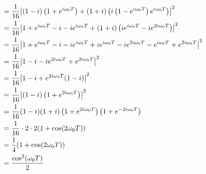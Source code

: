 \documentclass[11pt]{article}
\DeclarePairedDelimiter\abs{\lvert}{\rvert}
\begin{document}
\begin{enumerate}[label=\textbf{\arabic*.}]
{\begin{enumerate}[label=\textbf{(\alph*)}]
{\begin{align*}
                        &=\frac{1}{16}\abs*{(1-i)\left(1+e^{i\omega_0T}\right)+(1+i)\left(i\left(1-e^{i\omega_0T}\right)e^{i\omega_0T}\right)}^2 \\
                        &=\frac{1}{16}\abs*{1+e^{i\omega_0T}-i-ie^{i\omega_0T}+(1+i)\left(ie^{i\omega_0T}-ie^{2i\omega_0T}\right)}^2 \\
                        &=\frac{1}{16}\abs*{1+e^{i\omega_0T}-i-ie^{i\omega_0T}+ie^{i\omega_0T}-ie^{2i\omega_0T}-e^{i\omega_0T}+e^{2i\omega_0T}}^2 \\
                        &=\frac{1}{16}\abs*{1-i-ie^{2i\omega_0T}+e^{2i\omega_0T}}^2 \\
                        &=\frac{1}{16}\abs*{1-i+e^{2i\omega_0T}(1-i)}^2 \\
                        &=\frac{1}{16}\abs*{(1-i)\left(1+e^{2i\omega_0T}\right)}^2 \\
                        &=\frac{1}{16}(1-i)(1+i)\left(1+e^{2i\omega_0T}\right)\left(1+e^{-2i\omega_0T}\right) \\
                        &=\frac{1}{16}\cdot2\cdot2(1+\cos(2\omega_0T)) \\
                        &=\frac 1 4(1+\cos(2\omega_0T)) \\
                        &=\frac{\cos^2(\omega_0T)}{2}
                    \end{align*}
                }
            \end{enumerate}
        }
    \end{enumerate}
\end{document}
